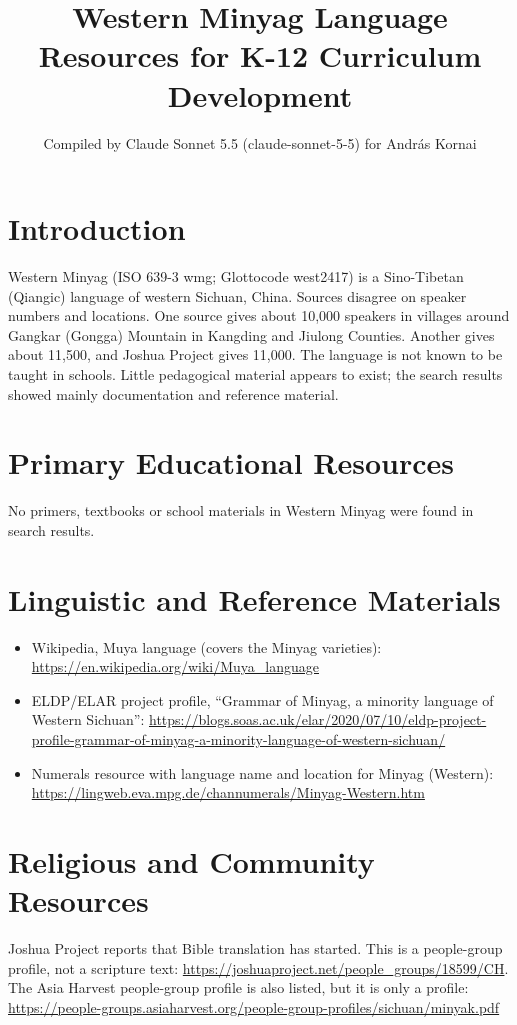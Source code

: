 \documentclass[12pt]{article}
\title{Western Minyag Language Resources for K-12 Curriculum Development}
\author{Compiled by Claude Sonnet 5.5 (claude-sonnet-5-5) for Andr\'as Kornai}
\date{}
\begin{document}
\maketitle

\section{Introduction}
Western Minyag (ISO 639-3 wmg; Glottocode west2417) is a Sino-Tibetan (Qiangic) language of western Sichuan, China. Sources disagree on speaker numbers and locations. One source gives about 10,000 speakers in villages around Gangkar (Gongga) Mountain in Kangding and Jiulong Counties. Another gives about 11,500, and Joshua Project gives 11,000. The language is not known to be taught in schools. Little pedagogical material appears to exist; the search results showed mainly documentation and reference material.

\section{Primary Educational Resources}
No primers, textbooks or school materials in Western Minyag were found in search results.

\section{Linguistic and Reference Materials}
\begin{itemize}
\item Wikipedia, Muya language (covers the Minyag varieties): \url{https://en.wikipedia.org/wiki/Muya_language}
\item ELDP/ELAR project profile, ``Grammar of Minyag, a minority language of Western Sichuan'': \url{https://blogs.soas.ac.uk/elar/2020/07/10/eldp-project-profile-grammar-of-minyag-a-minority-language-of-western-sichuan/}
\item Numerals resource with language name and location for Minyag (Western): \url{https://lingweb.eva.mpg.de/channumerals/Minyag-Western.htm}
\end{itemize}

\section{Religious and Community Resources}
Joshua Project reports that Bible translation has started. This is a people-group profile, not a scripture text: \url{https://joshuaproject.net/people_groups/18599/CH}. The Asia Harvest people-group profile is also listed, but it is only a profile: \url{https://people-groups.asiaharvest.org/people-group-profiles/sichuan/minyak.pdf}
\end{document}
